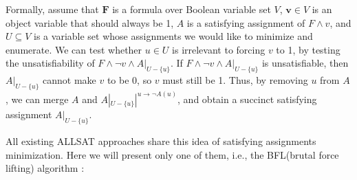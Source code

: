 \documentclass[journal]{IEEEtran}
\begin{document}
Formally,
assume that $\boldsymbol{F}$ is a formula over Boolean variable set $V$,
$\boldsymbol{v}\in V$ is an object variable that should always be 1,
$A$ is a satisfying assignment of $F\wedge v$,
and $U\subseteq V$ is a variable set whose assignments we would like to minimize and enumerate.
We can test whether $u\in U$ is irrelevant to forcing $v$ to 1,
by testing the unsatisfiability of $F\wedge \neg v\wedge A|_{U-\{u\}}$.
If $F\wedge \neg v\wedge A|_{U-\{u\}}$ is unsatisfiable,
then $A|_{U-\{u\}}$ cannot make $v$ to be 0,
so $v$ must still be 1.
Thus,
by removing $u$ from $A$,
we can merge $A$ and $A|_{U-\{u\}}|^{u\to \neg A(u)}$,
and obtain a succinct satisfying assignment $A|_{U-\{u\}}$.

All existing ALLSAT approaches \cite{PRIMECLAUSE,SATUNBMC,MINASS,EFFCON,MINCEX,MEMEFFALLSAT,REPARAM,EFFSATUSMCCO}
share this idea of satisfying assignments minimization.
Here we will present only one of them, i.e., the BFL(brutal force lifting) algorithm \cite{MINASS}:

\vspace{0.2cm}
\end{document}
